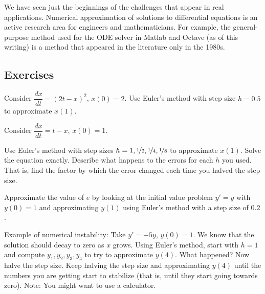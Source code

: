We have seen just the beginnings of the challenges that appear in real
applications.  Numerical approximation of solutions to differential
equations is an active research area for engineers and mathematicians.  For
example, the general-purpose method used for the ODE solver in Matlab and
Octave (as of this writing) is a method that appeared in the literature only
in the 1980s.

\subsection{Exercises}

\begin{exercise}
Consider $\dfrac{dx}{dt} = {(2t-x)}^2$, $x(0)=2$.  Use Euler's method
with step size $h=0.5$ to approximate $x(1)$.
\end{exercise}

\begin{samepage}
\begin{exercise}
Consider $\dfrac{dx}{dt} = t-x$, $x(0)=1$.
\begin{tasks}
\task Use Euler's method
with step sizes $h = 1, \nicefrac{1}{2}, \nicefrac{1}{4}, \nicefrac{1}{8}$ to
approximate
$x(1)$.
\task Solve the equation exactly.
\task Describe what happens to the
errors for each $h$ you used.  That is, find the factor by which the error
changed each time you halved the step size.
\end{tasks}
\end{exercise}
\end{samepage}

\begin{exercise}
Approximate the value of $e$ by looking at the initial value problem
$y'=y$ with $y(0)=1$ and approximating $y(1)$ using Euler's method with
a step size of $0.2$.
\end{exercise}

\begin{exercise}
Example of numerical instability:
Take $y' = -5y$, $y(0) = 1$.  We know that the
solution should decay to zero as $x$ grows.
Using Euler's method, start with $h=1$ and compute
$y_1, y_2, y_3, y_4$ to try to approximate $y(4)$.  What happened?
Now halve the step size.  Keep halving the step size and approximating $y(4)$
until the numbers you are getting
start to stabilize (that is, until they start going towards zero).
Note: You might want to use a calculator.
\end{exercise}

